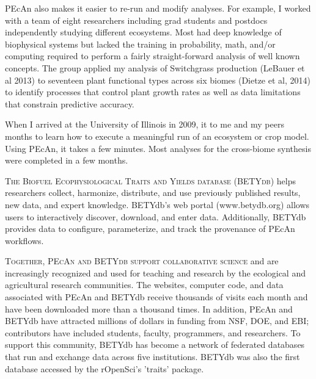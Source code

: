 \documentclass[english]{tufte-handout}
\providecommand\mynewthought[1]{%
   \addvspace{0.5em}%
   \noindent\hspace{-0.5em}\textsc{#1} %
}
\begin{document}
\begin{fullwidth}
  PEcAn also makes it easier to re-run and modify analyses.
  For example, I worked with a team of eight researchers including grad students and postdocs independently studying different ecosystems. 
  Most had deep knowledge of biophysical systems but lacked the training in probability, math, and/or computing required to perform a fairly straight-forward analysis of well known concepts.
 The group applied my analysis of Switchgrass production (LeBauer et al 2013) to seventeen plant functional types across six biomes (Dietze et al, 2014) to identify processes that control plant growth rates as well as data limitations that constrain predictive accuracy.

 When I arrived at the University of Illinois in 2009, it to me and my peers months to learn how to execute a meaningful run of an ecosystem or crop model.
 Using PEcAn, it takes a few minutes.
 Most analyses for the cross-biome synthesis were completed in a few months.

 \mynewthought{The Biofuel Ecophysiological Traits and Yields database (BETYdb)} helps researchers collect, harmonize, distribute, and use previously published results, new data, and expert knowledge.
 BETYdb's web portal (www.betydb.org) allows users to interactively discover, download, and enter data.
 Additionally, BETYdb provides data to configure, parameterize, and track the provenance of PEcAn workflows.
 
 \mynewthought{Together, PEcAn and BETYdb support collaborative science} and are increasingly recognized and used for teaching and research by the ecological and agricultural research communities.
The websites, computer code, and data associated with PEcAn and BETYdb receive thousands of visits each month and have been downloaded more than a thousand times. 
In addition, PEcAn and BETYdb have attracted millions of dollars in funding from NSF, DOE, and EBI; contributors have included students, faculty, programmers, and researchers.
 To support this community, BETYdb has become a network of federated databases that run and exchange data across five institutions.
 BETYdb was also the first database accessed by the rOpenSci's 'traits' package. %
   
 

\end{fullwidth}
\end{document}
